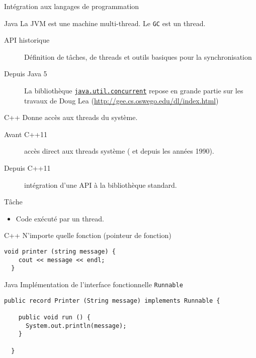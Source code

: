 \begin{frame}{Intégration aux langages de programmation}
  
\vfill
  \begin{block}{Java}
        La JVM est une machine multi-thread. Le \texttt{GC} est un thread.

    \begin{description}
    \item[API historique] Définition de tâches, de threads et outils basiques pour la synchronisation
    \item[Depuis Java 5] La bibliothèque \href{https://docs.oracle.com/javase/8/docs/api/java/util/concurrent/package-summary.html}{\lstinline{java.util.concurrent}}
    repose en grande partie sur les travaux de Doug Lea (\url{http://gee.cs.oswego.edu/dl/index.html})
    \end{description}
    \end{block}
\vfill
\begin{block}{C++}
    Donne accès aux threads du système.
    \begin{description}
    \item[Avant C++11] accès direct aux threads système ( et  depuis les années 1990).
    \item[Depuis C++11] intégration d'une API à la bibliothèque standard.
    \end{description}
    \end{block}
\vfill

\end{frame}


\begin{frame}[fragile]{Tâche}

  \begin{itemize}
  \item Code exécuté par un thread.
  \end{itemize}

  \begin{exampleblock}{C++}
    N'importe quelle fonction (pointeur de fonction)
    \begin{lstlisting}[numbers=none]
  void printer (string message) {
    cout << message << endl;
  }
    \end{lstlisting}
  \end{exampleblock}

  \begin{exampleblock}{Java}
  Implémentation de l'interface fonctionnelle \lstinline{Runnable}
     \begin{lstlisting}[numbers=none]
  public record Printer (String message) implements Runnable {

    public void run () {
      System.out.println(message);
    }

  }
    \end{lstlisting}
\end{exampleblock}
\end{frame}


